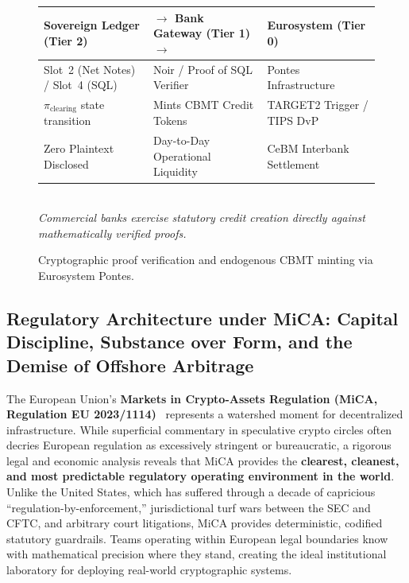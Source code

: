 \documentclass[a4paper,11pt,twoside,parskip=half-,headings=small]{scrartcl}
\begin{document}
\begin{figure}[H]
\centering
\begin{tcolorbox}[colback=accent!4,colframe=accent,width=0.92\linewidth,arc=2pt,title={\small Endogenous CBMT Minting via Eurosystem Pontes}]
\centering\footnotesize\color{ink}
\begin{tabularx}{\linewidth}{|>{\raggedright\arraybackslash}X|>{\centering\arraybackslash}p{4.0cm}|>{\raggedright\arraybackslash}X|}
\hline
\textbf{Sovereign Ledger (Tier 2)} & $\longrightarrow$ \textbf{Bank Gateway (Tier 1)} $\longrightarrow$ & \textbf{Eurosystem (Tier 0)}\\
\hline
Slot~2 (Net Notes) / Slot~4 (SQL) & Noir / Proof of SQL Verifier & Pontes Infrastructure\\
$\pi_{\text{clearing}}$ state transition & Mints CBMT Credit Tokens & TARGET2 Trigger / TIPS DvP\\
Zero Plaintext Disclosed & Day-to-Day Operational Liquidity & CeBM Interbank Settlement\\
\hline
\end{tabularx}\\[4pt]
\emph{Commercial banks exercise statutory credit creation directly against mathematically verified proofs.}
\end{tcolorbox}
\caption{Cryptographic proof verification and endogenous CBMT minting via Eurosystem Pontes.}
\label{fig:pontes_cbmt_minting}
\end{figure}

\subsection{Regulatory Architecture under MiCA: Capital Discipline, Substance over Form, and the Demise of Offshore Arbitrage}
\label{sec:mica_regulatory_architecture}

The European Union's \textbf{Markets in Crypto-Assets Regulation (MiCA, Regulation EU 2023/1114)}~\cite{mica2023} represents a watershed moment for decentralized infrastructure. While superficial commentary in speculative crypto circles often decries European regulation as excessively stringent or bureaucratic, a rigorous legal and economic analysis reveals that MiCA provides the \textbf{clearest, cleanest, and most predictable regulatory operating environment in the world}. Unlike the United States, which has suffered through a decade of capricious ``regulation-by-enforcement,'' jurisdictional turf wars between the SEC and CFTC, and arbitrary court litigations, MiCA provides deterministic, codified statutory guardrails. Teams operating within European legal boundaries know with mathematical precision where they stand, creating the ideal institutional laboratory for deploying real-world cryptographic systems.
\end{document}
